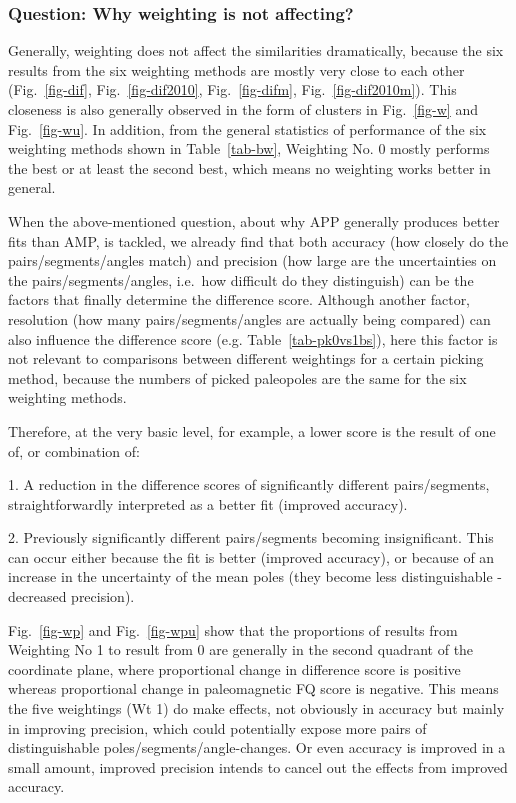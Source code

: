 \subsubsection{Question: Why weighting is not affecting?}

Generally, weighting does not affect the similarities dramatically, because the
six results from the six weighting methods are mostly very close to each other
(Fig.~\ref{fig-dif}, Fig.~\ref{fig-dif2010}, Fig.~\ref{fig-difm},
Fig.~\ref{fig-dif2010m}). This closeness is also generally observed in the form
of clusters in Fig.~\ref{fig-w} and Fig.~\ref{fig-wu}. In addition, from the
general statistics of performance of the six weighting methods shown in
Table~\ref{tab-bw}, Weighting No. 0 mostly performs the best or at least the
second best, which means no weighting works better in general.

When the above-mentioned question, about why APP generally produces better fits
than AMP, is tackled, we already find that both accuracy (how closely do the
pairs/segments/angles match) and precision (how large are the uncertainties on
the pairs/segments/angles, i.e.\ how difficult do they distinguish) can be the
factors that finally determine the difference score. Although another factor,
resolution (how many pairs/segments/angles are actually being compared) can
also influence the difference score (e.g. Table~\ref{tab-pk0vs1bs}), here this
factor is not relevant to comparisons between different weightings for a
certain picking method, because the numbers of picked paleopoles are the same
for the six weighting methods.

Therefore, at the very basic level, for example, a lower score is the result of
one of, or combination of:

1. A reduction in the difference scores of significantly different
pairs/segments, straightforwardly interpreted as a better fit (improved
accuracy).

2. Previously significantly different pairs/segments becoming insignificant.
This can occur either because the fit is better (improved accuracy), or because
of an increase in the uncertainty of the mean poles (they become less
distinguishable - decreased precision).

Fig.~\ref{fig-wp} and Fig.~\ref{fig-wpu} show that the proportions of results
from Weighting No 1 to result from 0 are generally in the second
quadrant of the coordinate plane, where proportional change in difference score
is positive whereas proportional change in paleomagnetic FQ score is negative.
This means the five weightings (Wt 1) do make effects, not obviously
in accuracy but mainly in improving precision, which could potentially expose
more pairs of distinguishable poles/segments/angle-changes. Or even accuracy is
improved in a small amount, improved precision intends to cancel out the effects
from improved accuracy.

